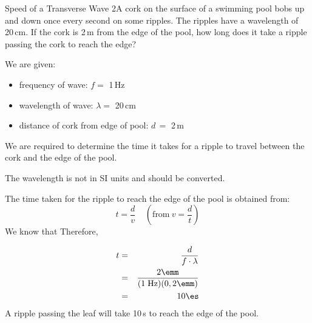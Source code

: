 \begin{definition}
\begin{wex}{Speed of a Transverse Wave 2}{A cork on the surface of a swimming pool bobs up and down once every second on some ripples. The ripples have a wavelength of 20\,cm. If the cork is 2\,m from the edge of the pool, how long does it take a ripple passing the cork to reach the edge?}{
We are given:
\begin{itemize}
\item{frequency of wave: $f =$ 1\,Hz}
\item{wavelength of wave: $\lambda =$ 20\,cm}
\item{distance of cork from edge of pool: $d\,=$ 2\,m}
\end{itemize}
We are required to determine the time it takes for a ripple to travel between the cork and the edge of the pool.

The wavelength is not in SI units and should be converted.

The time taken for the ripple to reach the edge of the pool is obtained from:
$$t=\frac{d}{v} \ \ \ \ \ (\text{from}\ v=\frac{d}{t})$$
We know that
Therefore,


\begin{eqnarray*}
t&=&\frac{d}{f\cdot \lambda}\\
&=&\frac{2\emm}{(1\;\mathrm{Hz})(0,2\emm)}\\
&=&10\es
\end{eqnarray*}
A ripple passing the leaf will take 10\,s to reach the edge of the pool.}
\end{wex}


\end{definition}
